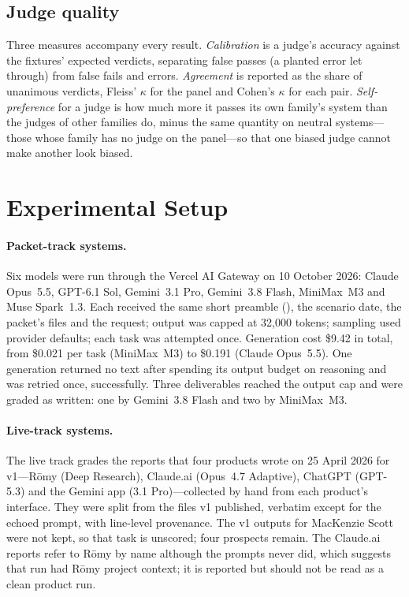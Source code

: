 \documentclass[11pt,a4paper]{article}
\newcommand{\romy}{R\={o}my}
\begin{document}
\subsection{Judge quality}
\label{sec:judgequality}

Three measures accompany every result. \emph{Calibration} is a judge's accuracy against the fixtures' expected verdicts, separating false passes (a planted error let through) from false fails and errors. \emph{Agreement} is reported as the share of unanimous verdicts, Fleiss' $\kappa$ \citep{fleiss1971measuring} for the panel and Cohen's $\kappa$ \citep{cohen1960coefficient} for each pair. \emph{Self-preference} for a judge is how much more it passes its own family's system than the judges of other families do, minus the same quantity on neutral systems---those whose family has no judge on the panel---so that one biased judge cannot make another look biased.

\section{Experimental Setup}
\label{sec:setup}

\paragraph{Packet-track systems.} Six models were run through the Vercel AI Gateway on 10 October 2026: Claude Opus~5.5, GPT-6.1 Sol, Gemini~3.1 Pro, Gemini~3.8 Flash, MiniMax~M3 and Muse Spark~1.3. Each received the same short preamble (), the scenario date, the packet's files and the request; output was capped at 32{,}000 tokens; sampling used provider defaults; each task was attempted once. Generation cost \$9.42 in total, from \$0.021 per task (MiniMax~M3) to \$0.191 (Claude Opus~5.5). One generation returned no text after spending its output budget on reasoning and was retried once, successfully. Three deliverables reached the output cap and were graded as written: one by Gemini~3.8 Flash and two by MiniMax~M3.

\paragraph{Live-track systems.} The live track grades the reports that four products wrote on 25 April 2026 for v1---\romy{} (Deep Research), Claude.ai (Opus~4.7 Adaptive), ChatGPT (GPT-5.3) and the Gemini app (3.1 Pro)---collected by hand from each product's interface. They were split from the files v1 published, verbatim except for the echoed prompt, with line-level provenance. The v1 outputs for MacKenzie Scott were not kept, so that task is unscored; four prospects remain. The Claude.ai reports refer to \romy{} by name although the prompts never did, which suggests that run had \romy{} project context; it is reported but should not be read as a clean product run.
\end{document}
